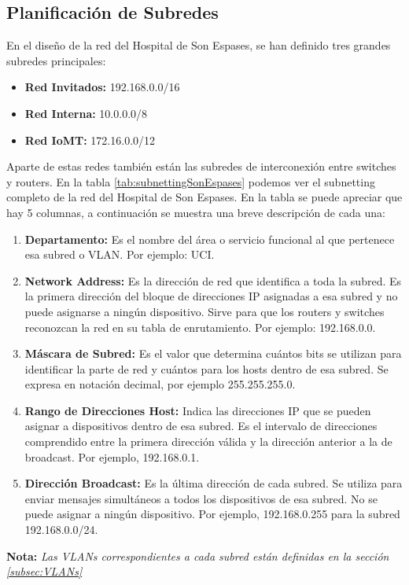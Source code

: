 \subsection{Planificación de Subredes}
En el diseño de la red del Hospital de Son Espases, se han definido tres grandes subredes principales:
\begin{itemize}
    \item \textbf{Red Invitados:} 192.168.0.0/16
    \item \textbf{Red Interna:} 10.0.0.0/8
    \item \textbf{Red IoMT:} 172.16.0.0/12
\end{itemize}
Aparte de estas redes también están las subredes de interconexión entre switches y routers. En la tabla \ref{tab:subnettingSonEspases} podemos ver el subnetting completo de la red del Hospital de 
Son Espases. En la tabla se puede apreciar que hay 5 columnas, a continuación se muestra una breve descripción de cada una:
\begin{enumerate}
    \item \textbf{Departamento:} Es el nombre del área o servicio funcional al que pertenece esa subred o VLAN. Por ejemplo: UCI.
    \item \textbf{Network Address:} Es la dirección de red que identifica a toda la subred. Es la primera dirección del bloque de direcciones IP asignadas a esa subred 
    y no puede asignarse a ningún dispositivo. Sirve para que los routers y switches reconozcan la red en su tabla de enrutamiento. Por ejemplo: 192.168.0.0.
    \item \textbf{Máscara de Subred:} Es el valor que determina cuántos bits se utilizan para identificar la parte de red y cuántos para los hosts dentro de esa subred. 
    Se expresa en notación decimal, por ejemplo 255.255.255.0.
    \item \textbf{Rango de Direcciones Host:} Indica las direcciones IP que se pueden asignar a dispositivos dentro de esa subred. Es el intervalo de direcciones 
    comprendido entre la primera dirección válida y la dirección anterior a la de broadcast. Por ejemplo, 192.168.0.1.
    \item \textbf{Dirección Broadcast:} Es la última dirección de cada subred. Se utiliza para enviar mensajes simultáneos a todos los dispositivos de esa subred. No se 
    puede asignar a ningún dispositivo. Por ejemplo, 192.168.0.255 para la subred 192.168.0.0/24.
\end{enumerate}

{\small \textbf{Nota: }\textit{Las VLANs correspondientes a cada subred están definidas en la sección \ref{subsec:VLANs}}}

